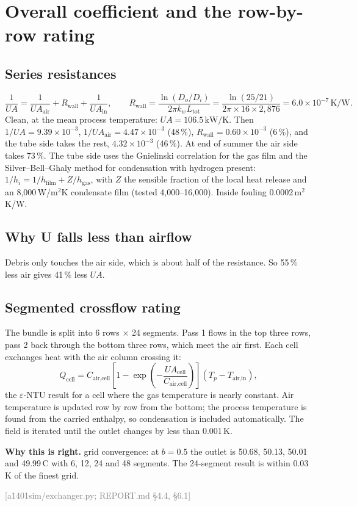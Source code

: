 \documentclass[11pt,a4paper]{article}
\newcommand{\unit}[1]{\ensuremath{\,\mathrm{#1}}}
\newcommand{\src}[1]{\textcolor{gray}{\small[#1]}}
\newcommand{\why}[1]{\par\noindent\textbf{Why this is right.} #1\par}
\begin{document}
\section{Overall coefficient and the row-by-row rating}

\subsection*{Series resistances}
\[
\frac{1}{UA} = \frac{1}{UA_\text{air}} + R_\text{wall} + \frac{1}{UA_\text{in}},\qquad
R_\text{wall} = \frac{\ln(D_o/D_i)}{2\pi k_w L_\text{tot}} = \frac{\ln(25/21)}{2\pi\times16\times2{,}876} = 6.0\times10^{-7}\unit{K/W}.
\]
Clean, at the mean process temperature: $UA = 106.5\unit{kW/K}$. Then $1/UA = 9.39\times10^{-3}$, $1/UA_\text{air} = 4.47\times10^{-3}$ (48\,\%), $R_\text{wall}=0.60\times10^{-3}$ (6\,\%), and the tube side takes the rest, $4.32\times10^{-3}$ (46\,\%). At end of summer the air side takes 73\,\%.
The tube side uses the Gnielinski correlation for the gas film and the Silver--Bell--Ghaly method for condensation with hydrogen present: $1/h_i = 1/h_\text{film} + Z/h_\text{gas}$, with $Z$ the sensible fraction of the local heat release and an 8{,}000\,W/m$^2$K condensate film (tested 4{,}000--16{,}000). Inside fouling 0.0002\,m$^2$K/W.

\subsection*{Why U falls less than airflow}
Debris only touches the air side, which is about half of the resistance. So 55\,\% less air gives 41\,\% less $UA$.

\subsection*{Segmented crossflow rating}
The bundle is split into 6 rows $\times$ 24 segments. Pass 1 flows in the top three rows, pass 2 back through the bottom three rows, which meet the air first. Each cell exchanges heat with the air column crossing it:
\[
Q_\text{cell} = C_\text{air,cell}\left[1-\exp\!\left(-\frac{UA_\text{cell}}{C_\text{air,cell}}\right)\right](T_p - T_\text{air,in}),
\]
the $\varepsilon$-NTU result for a cell where the gas temperature is nearly constant. Air temperature is updated row by row from the bottom; the process temperature is found from the carried enthalpy, so condensation is included automatically. The field is iterated until the outlet changes by less than 0.001\,K.
\why{grid convergence: at $b=0.5$ the outlet is 50.68, 50.13, 50.01 and 49.99\,\textdegree C with 6, 12, 24 and 48 segments. The 24-segment result is within 0.03\,K of the finest grid.}
\src{a1401sim/exchanger.py; REPORT.md \S4.4, \S6.1}
\end{document}
